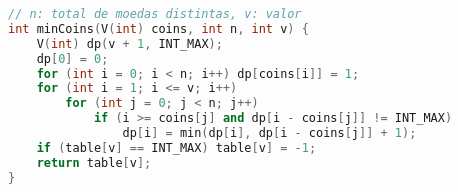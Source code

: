 \begin{lstlisting}[language = C++]
// n: total de moedas distintas, v: valor
int minCoins(V(int) coins, int n, int v) {
	V(int) dp(v + 1, INT_MAX); 
	dp[0] = 0;
    for (int i = 0; i < n; i++) dp[coins[i]] = 1;
    for (int i = 1; i <= v; i++)
    	for (int j = 0; j < n; j++)
        	if (i >= coins[j] and dp[i - coins[j]] != INT_MAX)
            	dp[i] = min(dp[i], dp[i - coins[j]] + 1);
    if (table[v] == INT_MAX) table[v] = -1;
    return table[v];
}
\end{lstlisting}